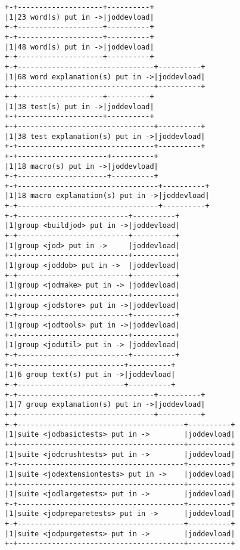 \documentclass[11pt,letter,landscape]{article}
\begin{document}
    \begin{Verbatim}[commandchars=\\\{\}]
+-+--------------------+----------+
|1|23 word(s) put in ->|joddevload|
+-+--------------------+----------+
+-+--------------------+----------+
|1|48 word(s) put in ->|joddevload|
+-+--------------------+----------+
+-+--------------------------------+----------+
|1|68 word explanation(s) put in ->|joddevload|
+-+--------------------------------+----------+
+-+--------------------+----------+
|1|38 test(s) put in ->|joddevload|
+-+--------------------+----------+
+-+--------------------------------+----------+
|1|38 test explanation(s) put in ->|joddevload|
+-+--------------------------------+----------+
+-+---------------------+----------+
|1|18 macro(s) put in ->|joddevload|
+-+---------------------+----------+
+-+---------------------------------+----------+
|1|18 macro explanation(s) put in ->|joddevload|
+-+---------------------------------+----------+
+-+--------------------------+----------+
|1|group <buildjod> put in ->|joddevload|
+-+--------------------------+----------+
|1|group <jod> put in ->     |joddevload|
+-+--------------------------+----------+
|1|group <joddob> put in ->  |joddevload|
+-+--------------------------+----------+
|1|group <jodmake> put in -> |joddevload|
+-+--------------------------+----------+
|1|group <jodstore> put in ->|joddevload|
+-+--------------------------+----------+
|1|group <jodtools> put in ->|joddevload|
+-+--------------------------+----------+
|1|group <jodutil> put in -> |joddevload|
+-+--------------------------+----------+
+-+-------------------------+----------+
|1|6 group text(s) put in ->|joddevload|
+-+-------------------------+----------+
+-+--------------------------------+----------+
|1|7 group explanation(s) put in ->|joddevload|
+-+--------------------------------+----------+
+-+---------------------------------------+----------+
|1|suite <jodbasictests> put in ->        |joddevload|
+-+---------------------------------------+----------+
|1|suite <jodcrushtests> put in ->        |joddevload|
+-+---------------------------------------+----------+
|1|suite <jodextensiontests> put in ->    |joddevload|
+-+---------------------------------------+----------+
|1|suite <jodlargetests> put in ->        |joddevload|
+-+---------------------------------------+----------+
|1|suite <jodpreparetests> put in ->      |joddevload|
+-+---------------------------------------+----------+
|1|suite <jodpurgetests> put in ->        |joddevload|
+-+---------------------------------------+----------+

\end{Verbatim}
\end{document}
